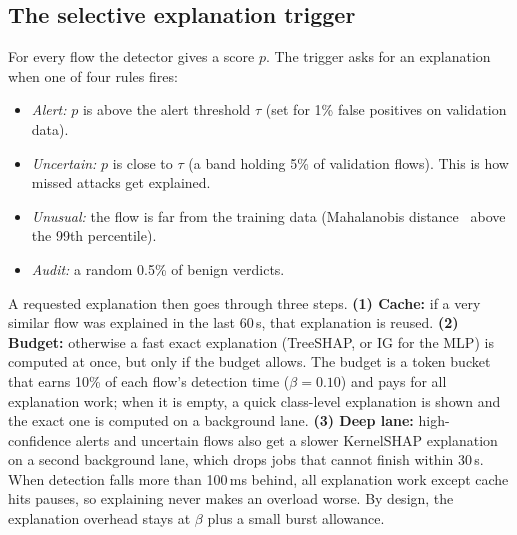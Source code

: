 \subsection{The selective explanation trigger}
\label{sec:trigger}
For every flow the detector gives a score $p$. The trigger asks for an explanation when one of four rules fires:
\begin{itemize}[leftmargin=*, itemsep=0pt]
  \item \emph{Alert:} $p$ is above the alert threshold $\tau$ (set for 1\% false positives on validation data).
  \item \emph{Uncertain:} $p$ is close to $\tau$ (a band holding 5\% of validation flows). This is how missed attacks get explained.
  \item \emph{Unusual:} the flow is far from the training data (Mahalanobis distance~\cite{ledoit2004} above the 99th percentile).
  \item \emph{Audit:} a random 0.5\% of benign verdicts.
\end{itemize}
A requested explanation then goes through three steps. \textbf{(1) Cache:} if a very similar flow was explained in the last 60\,s, that explanation is reused. \textbf{(2) Budget:} otherwise a fast exact explanation (TreeSHAP, or IG for the MLP) is computed at once, but only if the budget allows. The budget is a token bucket that earns 10\% of each flow's detection time ($\beta=0.10$) and pays for all explanation work; when it is empty, a quick class-level explanation is shown and the exact one is computed on a background lane. \textbf{(3) Deep lane:} high-confidence alerts and uncertain flows also get a slower KernelSHAP explanation on a second background lane, which drops jobs that cannot finish within 30\,s. When detection falls more than 100\,ms behind, all explanation work except cache hits pauses, so explaining never makes an overload worse. By design, the explanation overhead stays at $\beta$ plus a small burst allowance.
